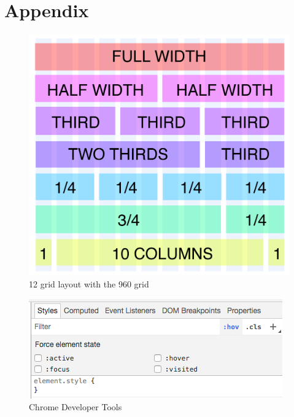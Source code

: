 \chapter*{Appendix}

\begin{figure}[h]
\caption{12 grid layout with the 960 grid}
  \label{fig:grid}
\includegraphics[scale=0.4]{../public/images/960-12-col-grid}
\centering
\end{figure}

\begin{figure}[h]
\caption{Chrome Developer Tools}
  \label{fig:tools}
\includegraphics{../public/images/tools}
\centering
\end{figure}

